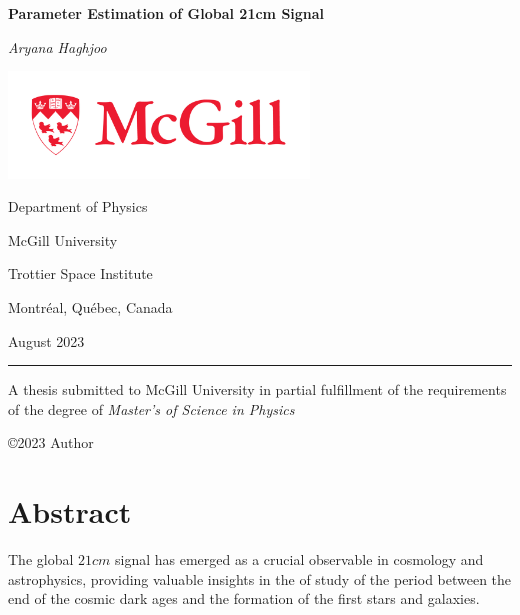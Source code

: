 \documentclass[12pt, TexShade, letterpaper]{report}
\author{\textcopyright Author, August, 2020}
\date{}
\renewcommand{\chaptermark}[1]{\markboth{#1}{}} %
\begin{document}
\begin{titlepage}
		\begin{center}
			\vspace*{0.5cm}

			\LARGE
			\textbf{Parameter Estimation of Global 21cm Signal}
			\vspace{1cm}
			
			\textit{Aryana Haghjoo}
			
			\vspace{1cm}
			
			\includegraphics[width=0.6\textwidth]{McGill_logo.png}
			
			\vspace{1cm}
			
			\Large
			Department of Physics
			
			\vspace{-5mm}
			McGill University
			
			\vspace{-5mm}
			Trottier Space Institute
			
			\vspace{-5mm}
			Montr\'eal, Qu\'ebec, Canada
			
			\vspace{5mm}
			August 2023
			\small
			\vspace{0.5cm}
			{\color{red} \hrule height 0.75mm}
			
			\vspace{0.2cm}
			
			A thesis submitted to McGill University in partial fulfillment of the requirements of the degree of
			\emph{Master's of Science in Physics}
		
			\copyright\hspace{0.5mm}2023 Author
			
		\end{center}
	\end{titlepage}
\setlength{\voffset}{2cm}
\renewcommand{\chaptermark}[1]{%
	\markboth{\thechapter.\ #1}{}}
\chapter*{Abstract}
	\label{chap:engAbstract}
The global $21cm$ signal has emerged as a crucial observable in cosmology and astrophysics, providing valuable insights in the of study of the period between the end of the cosmic dark ages and the formation of the first stars and galaxies.\par
\end{document}
